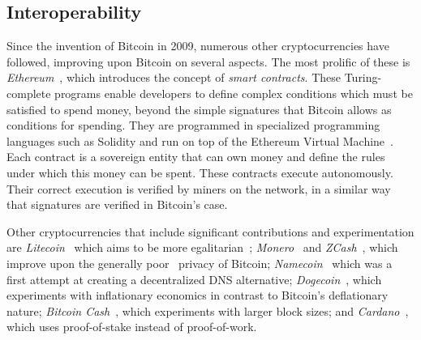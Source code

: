 \subsection{Interoperability}
Since the invention of Bitcoin in 2009, numerous other cryptocurrencies have
followed, improving upon Bitcoin on several aspects. The most prolific of these
is \emph{Ethereum}~\cite{buterin}, which introduces the concept of \emph{smart
contracts}. These Turing-complete programs enable developers to define complex
conditions which must be satisfied to spend money, beyond the simple signatures
that Bitcoin allows as conditions for spending. They are programmed in
specialized programming languages such as Solidity and run on top of the
Ethereum Virtual Machine~\cite{wood}. Each contract is a sovereign entity that
can own money and define the rules under which this money can be spent. These
contracts execute autonomously. Their correct execution is verified by miners on
the network, in a similar way that signatures are verified in Bitcoin's case.

Other cryptocurrencies that include significant contributions and
experimentation are \emph{Litecoin}~\cite{litecoin} which aims to be more
egalitarian~\cite{egalitarianism}; \emph{Monero}~\cite{cryptonote} and
\emph{ZCash}~\cite{zerocoin,zcash}, which improve upon the generally
poor~\cite{fistful,quantitative-bitcoin-analysis,tumblebit} privacy of
Bitcoin; \emph{Namecoin}~\cite{namecoin} which was a first attempt at creating a
decentralized DNS alternative; \emph{Dogecoin}~\cite{dogecoin}, which experiments with
inflationary economics in contrast to Bitcoin's deflationary nature;
\emph{Bitcoin Cash}~\cite{btcVSbch}, which experiments with larger block sizes; and
\emph{Cardano}~\cite{ouroboros}, which uses proof-of-stake instead of proof-of-work.

